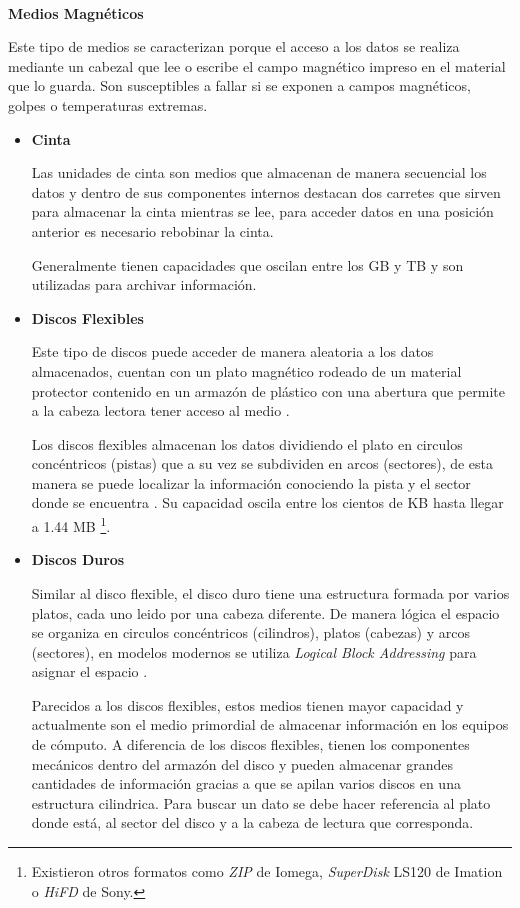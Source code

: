 \textbf{\\ Medios Magn\'{e}ticos \\}

Este tipo de medios se caracterizan porque el acceso a los datos se realiza mediante un cabezal que lee o escribe el campo magn\'{e}tico impreso en el material que lo guarda. Son susceptibles a fallar si se exponen a campos magn\'{e}ticos, golpes o temperaturas extremas.

\begin{itemize}

  \item \textbf{Cinta}
  
  Las unidades de cinta son medios que almacenan de manera secuencial los datos y dentro de sus componentes internos destacan dos carretes que sirven para almacenar la cinta mientras se lee, para acceder datos en una posici\'{o}n anterior es necesario rebobinar la cinta.
  
  Generalmente tienen capacidades que oscilan entre los GB y TB  \cite{_powervault_????} y son utilizadas para archivar informaci\'{o}n.
  
  \item \textbf{Discos Flexibles}
  
  Este tipo de discos puede acceder de manera aleatoria a los datos almacenados, cuentan con un plato magn\'{e}tico rodeado de un material protector contenido en un armaz\'{o}n de pl\'{a}stico con una abertura que permite a la cabeza lectora tener acceso al medio \cite{_anatomy_????}.
  
  Los discos flexibles almacenan los datos dividiendo el plato en circulos conc\'{e}ntricos (pistas) que a su vez se subdividen en arcos (sectores), de esta manera se puede localizar la informaci\'{o}n conociendo la pista y el sector donde se encuentra \cite{_illustrated_????}. Su capacidad oscila entre los cientos de KB hasta llegar a 1.44 MB \footnote{Existieron otros formatos como \textit{ZIP} de Iomega, \textit{SuperDisk} LS120 de Imation o \textit{HiFD} de Sony.}.
  
  \item \textbf{Discos Duros}
  
  Similar al disco flexible, el disco duro tiene una estructura formada por varios platos, cada uno leido por una cabeza diferente. De manera l\'{o}gica el espacio se organiza en circulos conc\'{e}ntricos (cilindros), platos (cabezas) y arcos (sectores), en modelos modernos se utiliza \emph{Logical Block Addressing} para asignar el espacio \cite{_introduction_????}.
  
  Parecidos a los discos flexibles, estos medios tienen mayor capacidad y actualmente son el medio primordial de almacenar informaci\'{o}n en los equipos de c\'{o}mputo. A diferencia de los discos flexibles, tienen los componentes mec\'{a}nicos dentro del armaz\'{o}n del disco y pueden almacenar grandes cantidades de informaci\'{o}n gracias a que se apilan varios discos en una estructura cilindrica. Para buscar un dato se debe hacer referencia al plato donde est\'{a}, al sector del disco y a la cabeza de lectura que corresponda.
  
\end{itemize}

